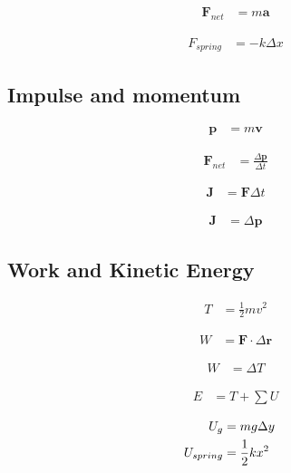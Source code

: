 \documentclass[12pt]{article}
\begin{document}
\begin{align}
{\bm F}_{net} &= m {\bm a}
\end{align}

\begin{align}
F_{spring} &= - k \Delta x
\end{align}



\subsection{Impulse and momentum}

\begin{align}
{\bm p} &=  m {\bm v}
\end{align}

\begin{align}
{\bm F}_{net} &= \frac {\Delta \bm p}{\Delta t}
\end{align}

\begin{align}
{\bm J} &= { \bm F}{\Delta t}
\end{align}

\begin{align}
{\bm J} &= \Delta {\bm p}
\end{align}

\subsection{Work and Kinetic Energy}

\begin{align}
T &=  \frac12 m v^2 
\end{align}

\begin{align}
W &= { \bm F} \cdot {\Delta \bm r}
\end{align}

\begin{align}
W&= \Delta T
\end{align}

\begin{align}
E&= T + \sum U
\end{align}


\begin{align}
U_{g}&= mg\Delta y
\cr
U_{spring}&= \frac12 k x^2
\end{align}




%
%
\end{document}
